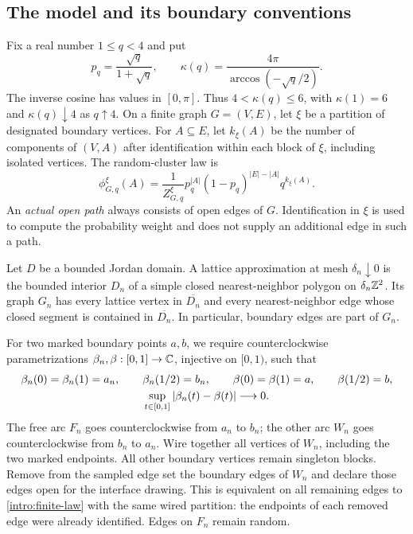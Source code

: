 \subsection{The model and its boundary conventions}
\label{intro:model}

Fix a real number $1\le q<4$ and put
\begin{equation}\label{intro:parameters}
 p_q=\frac{\sqrt q}{1+\sqrt q},
 \qquad
 \kappa(q)=\frac{4\pi}{\arccos(-\sqrt q/2)}.
\end{equation}
The inverse cosine has values in $[0,\pi]$.  Thus $4<\kappa(q)\le6$,
with $\kappa(1)=6$ and $\kappa(q)\downarrow4$ as $q\uparrow4$.  On a finite graph $G=(V,E)$,
let $\xi$ be a partition of designated boundary vertices.  For
$A\subseteq E$, let $k_\xi(A)$ be the number of components of $(V,A)$
after identification within each block of $\xi$, including isolated
vertices.  The random-cluster law is
\begin{equation}\label{intro:finite-law}
 \phi_{G,q}^{\xi}(A)
 =\frac{1}{Z_{G,q}^{\xi}}
 p_q^{|A|}(1-p_q)^{|E|-|A|}q^{k_\xi(A)}.
\end{equation}
An \emph{actual open path} always consists of open edges of $G$.
Identification in $\xi$ is used to compute the probability weight and
does not supply an additional edge in such a path.

Let $D$ be a bounded Jordan domain.  A lattice approximation at mesh
$\delta_n\downarrow0$ is the bounded interior $D_n$ of a simple closed
nearest-neighbor polygon on $\delta_n\mathbb Z^2$.  Its graph $G_n$ has every
lattice vertex in $\overline{D_n}$ and every nearest-neighbor edge whose
closed segment is contained in $\overline{D_n}$.  In particular, boundary
edges are part of $G_n$.

For two marked boundary points $a,b$, we require counterclockwise
parametrizations $\beta_n,\beta:[0,1]\to\mathbb C$, injective on $[0,1)$,
such that
\begin{gather}\label{intro:marked-jordan}
 \beta_n(0)=\beta_n(1)=a_n,\qquad \beta_n(1/2)=b_n,\qquad
 \beta(0)=\beta(1)=a,\qquad \beta(1/2)=b,\\
 \sup_{t\in[0,1]}|\beta_n(t)-\beta(t)|\longrightarrow0.\notag
\end{gather}
The free arc $F_n$ goes counterclockwise from $a_n$ to $b_n$; the other
arc $W_n$ goes counterclockwise from $b_n$ to $a_n$.  Wire together all
vertices of $W_n$, including the two marked endpoints.  All other
boundary vertices remain singleton blocks.  Remove from the sampled edge
set the boundary edges of $W_n$ and declare those edges open for the
interface drawing.  This is equivalent on all remaining edges to
\eqref{intro:finite-law} with the same wired partition: the endpoints of
each removed edge were already identified.  Edges on $F_n$ remain random.

